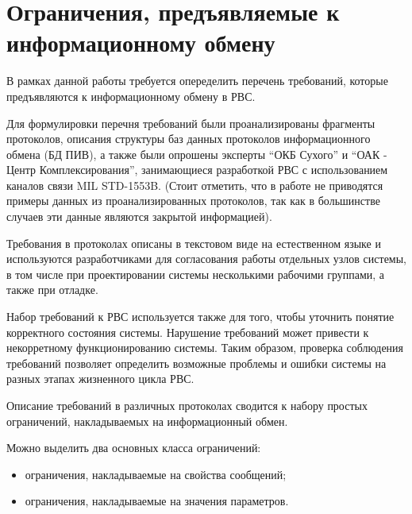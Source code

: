 \section{Ограничения, предъявляемые к информационному обмену}

\iffalse

Тезисы:

0. В разных протоколах написаны примерно одинаковые вещи =>
1. Требования нужно разбивать на простые, и это будет универсально и удобно.
2. Список требований как результат изучения протоколов и обсуждения с 
разработчиками и тестерами РВС.
3. Замечание о том, что в данной работе мы работаем с МКИО, но подразумевается 
расширение и на другие каналы связи.

\fi

В рамках данной работы требуется опеределить перечень требований, которые 
предъявляются к информационному обмену в РВС.

Для формулировки перечня требований были проанализированы фрагменты протоколов, 
описания структуры баз данных протоколов информационного обмена (БД ПИВ), а 
также были опрошены эксперты ``ОКБ Сухого'' и ``ОАК - Центр Комплексирования'', 
занимающиеся разработкой РВС с использованием каналов связи MIL STD-1553B. 
(Стоит отметить, что в работе не приводятся примеры данных из 
проанализированных протоколов, так как в большинстве случаев эти данные 
являются закрытой информацией).

Требования в протоколах описаны в текстовом виде на естественном 
языке и используются разработчиками для согласования работы отдельных узлов 
системы, в том числе при проектировании системы несколькими рабочими группами, 
а также при отладке.

Набор требований к РВС используется также для того, чтобы уточнить понятие 
корректного состояния системы. Нарушение требований может привести к 
некорретному функционированию системы. Таким образом, проверка соблюдения 
требований позволяет определить возможные проблемы и ошибки системы на разных 
этапах жизненного цикла РВС.

Описание требований в различных протоколах сводится к 
набору простых ограничений, накладываемых на информационный обмен. 

Можно выделить два основных класса ограничений:

\begin{itemize}
 \item ограничения, накладываемые на свойства сообщений;
 \item ограничения, накладываемые на значения параметров.
\end{itemize}

